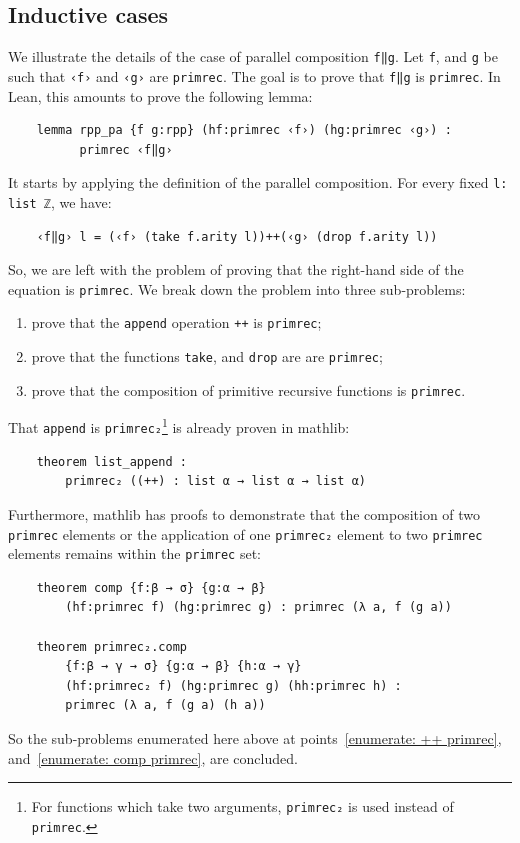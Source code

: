\documentclass[preprint]{elsarticle}
\theoremstyle{remark}
\newcommand{\MATHLIB}{\textsf{mathlib}\xspace}
\newcommand{\LEAN}{\textsf{Lean}\xspace}
\begin{document}
\subsection{Inductive cases}
We illustrate the details of the case of parallel composition \lstinline|f‖g|. Let \lstinline|f|, and \lstinline|g| be such that \lstinline|‹f›| and \lstinline|‹g›| are \lstinline|primrec|. The goal is to prove that \lstinline|f‖g| is \lstinline|primrec|. In \LEAN, this amounts to prove the following lemma:
\begin{lstlisting}
    lemma rpp_pa {f g:rpp} (hf:primrec ‹f›) (hg:primrec ‹g›) :
          primrec ‹f‖g›
\end{lstlisting}
\noindent
It starts by applying the definition of the parallel composition. For every fixed \lstinline|l: list ℤ|, we have:
\begin{lstlisting}
    ‹f‖g› l = (‹f› (take f.arity l))++(‹g› (drop f.arity l))
\end{lstlisting}
\noindent
So, we are left with the problem of proving that the right-hand side of the equation is \lstinline|primrec|. We break down the problem into three sub-problems:
\begin{enumerate}
    \item \label{enumerate: ++ primrec}
    prove that the \lstinline|append| operation \lstinline|++| is \lstinline|primrec|;
    \item \label{enumerate: drop primrec}
    prove that the functions \lstinline|take|, and \lstinline|drop| are are \lstinline|primrec|;
    \item \label{enumerate: comp primrec}
    prove that the composition of primitive recursive functions is \lstinline|primrec|.
\end{enumerate}
\noindent
That \lstinline|append| is \lstinline|primrec₂|\footnote{For functions which take two arguments, \lstinline|primrec₂| is used instead of \lstinline|primrec|.} is already proven in \MATHLIB:
\begin{lstlisting}
    theorem list_append :
        primrec₂ ((++) : list α → list α → list α)
\end{lstlisting}
\noindent
Furthermore, \MATHLIB has proofs to demonstrate that the composition of two \lstinline|primrec| elements or the application of one \lstinline|primrec₂| element to two \lstinline|primrec| elements remains within the \lstinline|primrec| set:
\begin{lstlisting}
    theorem comp {f:β → σ} {g:α → β}
        (hf:primrec f) (hg:primrec g) : primrec (λ a, f (g a))

    theorem primrec₂.comp
        {f:β → γ → σ} {g:α → β} {h:α → γ}
        (hf:primrec₂ f) (hg:primrec g) (hh:primrec h) :
        primrec (λ a, f (g a) (h a))
\end{lstlisting}
\noindent
So the sub-problems enumerated here above at points~\ref{enumerate: ++ primrec}, and~\ref{enumerate: comp primrec}, are concluded.
\end{document}

